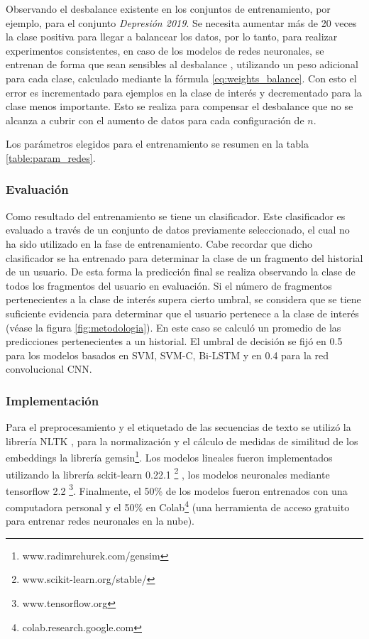 Observando el desbalance existente en los conjuntos de entrenamiento, por ejemplo, para el conjunto \textit{Depresión 2019}. Se necesita aumentar más de 20 veces la clase positiva para llegar a balancear los datos, por lo tanto, para realizar experimentos consistentes, en caso de los modelos de redes neuronales, se entrenan de forma que sean sensibles al desbalance \citep{wang2016training}, utilizando un peso adicional para cada clase, calculado mediante la fórmula \ref{eq:weights_balance}. Con esto el error es incrementado para ejemplos en la clase de interés y decrementado para la clase menos importante. Esto se realiza para compensar el desbalance que no se alcanza a cubrir con el aumento de datos para cada configuración de $n$.

Los parámetros elegidos para el entrenamiento se resumen en la tabla \ref{table:param_redes}. 

\subsubsection{Evaluación}

Como resultado del entrenamiento se tiene un clasificador. Este clasificador es evaluado a través de un conjunto de datos previamente seleccionado, el cual no ha sido utilizado en la fase de entrenamiento. Cabe recordar que dicho clasificador se ha entrenado para determinar la clase de un fragmento del historial de un usuario. De esta forma la predicción final se realiza observando la clase de todos los fragmentos del usuario en evaluación. Si el número de fragmentos pertenecientes a la clase de interés supera cierto umbral, se considera que se tiene suficiente evidencia para determinar que el usuario pertenece a la clase de interés (véase la figura \ref{fig:metodologia}). En este caso se calculó un promedio de las predicciones pertenecientes a un historial. El umbral de decisión se fijó en 0.5 para los modelos basados en SVM, SVM-C, Bi-LSTM y en 0.4 para la red convolucional CNN. 



\subsubsection{Implementación}
Para el preprocesamiento y el etiquetado de las secuencias de texto se utilizó la librería NLTK \citep{loper2002nltk}, para la normalización y el cálculo de medidas de similitud de los embeddings la librería gemsin\footnote{www.radimrehurek.com/gensim}.
Los modelos lineales fueron implementados utilizando la librería sckit-learn 0.22.1 \footnote{www.scikit-learn.org/stable/} , los modelos neuronales mediante tensorflow 2.2 \footnote{www.tensorflow.org}. %
Finalmente, el 50\% de los modelos fueron entrenados con una computadora personal y el 50\% en Colab\footnote{colab.research.google.com} (una herramienta de acceso gratuito para entrenar redes neuronales en la nube).
